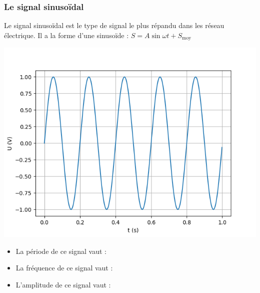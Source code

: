 \documentclass[10pt,fleqn]{article} %
\begin{document}
    \subsubsection{Le signal sinusoïdal}
    Le signal sinusoïdal est le type de signal le plus répandu dans les réseau électrique. Il a la forme d'une sinusoïde : $S = A\sin{\omega t} + S_\text{moy}$
    
    \begin{center}
        \includegraphics[height=0.3\textheight]{images/sinus.png}
    \end{center}
    \begin{itemize}
        \item La période de ce signal vaut : 
        \item La fréquence de ce signal vaut : 
        \item  L'amplitude de ce signal vaut : 
    \end{itemize}
        
        
       
    
\end{document}
